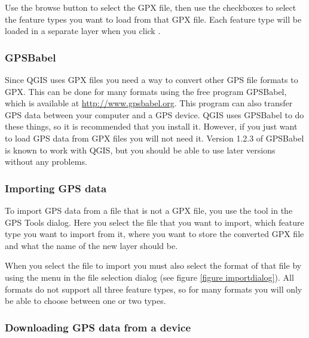 Use the browse button \browsebutton to select the GPX file, then use the checkboxes to select the feature types you want to load from that GPX file.
Each feature type will be loaded in a separate layer when you click .

\subsubsection{GPSBabel}

Since QGIS uses GPX files you need a way to convert other GPS file formats to GPX.
This can be done for many formats using the free program GPSBabel, which is available at \url{http://www.gpsbabel.org}.
This program can also transfer GPS data between your computer and a GPS device.
QGIS uses GPSBabel to do these things, so it is recommended that you install it.
However, if you just want to load GPS data from GPX files you will not need it.
Version 1.2.3 of GPSBabel is known to work with QGIS, but you should be able to use later versions without
any problems.


\subsubsection{Importing GPS data}

To import GPS data from a file that is not a GPX file, you use the tool  in the GPS Tools dialog.
Here you select the file that you want to import, which feature type you want to import from it, where you want to store the converted GPX file and what the name of the new layer should be.

When you select the file to import you must also select the format of that file by using the menu in the file selection dialog (see figure \ref{figure importdialog}).
All formats do not support all three feature types, so for many formats you will only be able to choose between one or two types.


\subsubsection{Downloading GPS data from a device}

